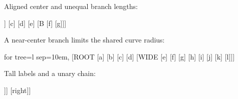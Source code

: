 \documentclass{article}
\begin{document}
Aligned center and unequal branch lengths:
\begin{fittedterminaltree}
  [ROOT [A [a] [b]] [c] [d] [e] [B [f] [g]]]
\end{fittedterminaltree}

A near-center branch limits the shared curve radius:
\begin{fittedterminaltree}
  for tree={l sep=10em},
  [ROOT
    [a] [b] [c] [d]
    [WIDE [e] [f] [g] [h] [i] [j] [k] [l]]]
\end{fittedterminaltree}

Tall labels and a unary chain:
\begin{fittedterminaltree}
  [ROOT [left] [Tall\\multiline\\label [CHAIN [middle]]] [right]]
\end{fittedterminaltree}
\end{document}
